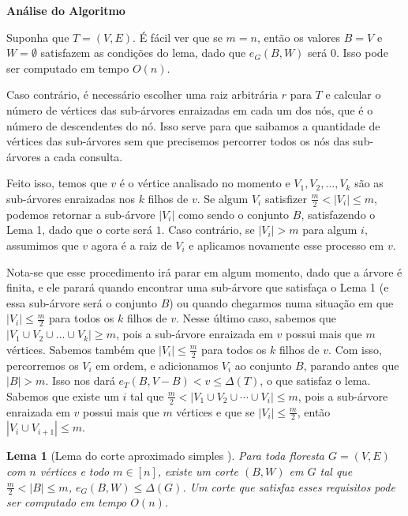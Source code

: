 \documentclass[a4paper,12pt]{article}
\newtheorem{lem}{Lema}
\begin{document}
\medskip
\medskip

\textbf{Análise do Algoritmo}

	Suponha que $T=(V,E)$.
	É fácil ver que se $m=n$, então os valores $B = V$ e $W = \emptyset$ 
	satisfazem as condições do lema, dado que $e_G(B,W)$ será $0$. 
	Isso pode ser computado em tempo $O(n)$.

	Caso contrário, é necessário escolher uma raiz arbitrária $r$ para $T$
	e calcular o número de vértices das sub-árvores enraizadas 
	em cada um dos nós, que é o número de descendentes do nó.
	Isso serve para que saibamos a quantidade de vértices das sub-árvores
	sem que precisemos percorrer todos os nós das sub-árvores a cada consulta.

	Feito isso, temos que $v$ é o vértice analisado no momento e 
	$V_1, V_2, \ldots, V_k$ são as sub-árvores enraizadas nos $k$ filhos
	de $v$.
	Se algum $V_i$ satisfizer $\frac{m}{2}<|V_i|\le m$, podemos retornar
	a sub-árvore $|V_i|$ como sendo o conjunto $B$, satisfazendo o Lema 1,
	dado que o corte será $1$.
	Caso contrário, se $|V_i|> m$ para algum $i$, assumimos que 
	$v$ agora é a raiz de $V_i$ e aplicamos novamente esse processo em $v$.

	Nota-se que esse procedimento irá parar em algum momento, dado que a árvore 
	é finita, e ele parará quando encontrar
	uma sub-árvore que satisfaça o Lema 1 (e essa sub-árvore será o conjunto $B$) 
	ou quando chegarmos numa situação em que  
	$|V_i|\le \frac{m}{2}$ para todos os $k$ filhos de $v$.
	Nesse último caso, sabemos que $|V_1\cup V_2\cup \ldots \cup V_k|\ge m$, pois
	a sub-árvore enraizada em $v$ possui mais que $m$ vértices. 
	Sabemos também que $|V_i|\le \frac{m}{2}$ para todos os $k$ filhos de $v$. 
	Com isso, percorremos os $V_i$ em ordem, e 
	adicionamos $V_i$ ao conjunto $B$, parando antes que $|B| > m$. Isso nos dará
	$e_T(B,V-B) < v \le \Delta(T)$, o que satisfaz o lema.
	Sabemos que existe um $i$ tal que 
	$\frac{m}{2} < |V_1 \cup V_2 \cup \cdots \cup V_i| \le m$, pois a sub-árvore
	enraizada em $v$ possui mais que $m$ vértices e que se $|V_i|\le \frac{m}{2}$,
	então $|V_i \cup V_{i+1}| \le m$.


\bigskip
\bigskip
\bigskip
\bigskip
\bigskip
\bigskip
\bigskip
\bigskip

\begin{lem}[Lema do corte aproximado simples {\cite[Lemma 2]{Schmidt15}}]

	Para toda floresta $G=(V,E)$ com $n$ vértices e todo $m \in [n]$,
	existe um corte $(B,W)$ em $G$ tal que 
	$\frac{m}{2} <|B| \le m$,
	$e_G(B,W) \le \Delta(G)$.
	Um corte que satisfaz esses requisitos pode ser computado em
	tempo $O(n)$.
\end{lem}
\end{document}

